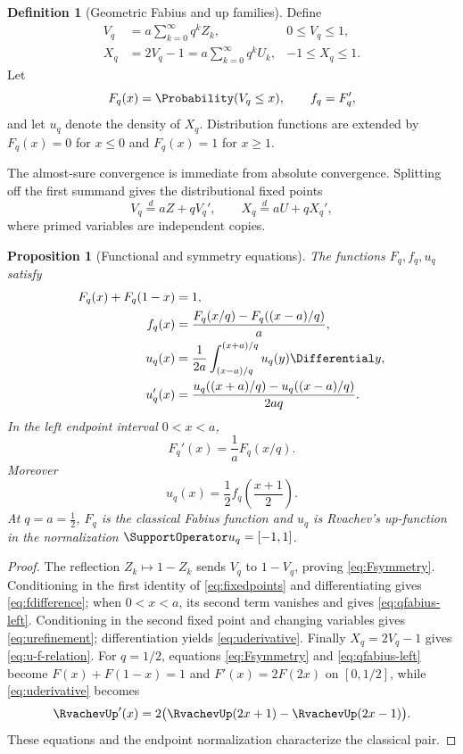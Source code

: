 \documentclass[11pt,oneside]{article}
\newtheorem{proposition}[theorem]{Proposition}
\theoremstyle{definition}
\newtheorem{definition}[theorem]{Definition}
\theoremstyle{remark}
\begin{document}
\begin{definition}[Geometric Fabius and up families]
Define
\begin{align}
 V_q&=a\sum_{k=0}^{\infty}q^kZ_k, & 0\le V_q\le1,\\
 X_q&=2V_q-1=a\sum_{k=0}^{\infty}q^kU_k, & -1\le X_q\le1.
\end{align}
Let
\[
 F_q(x)=\Probability(V_q\le x),\qquad f_q=F_q',
\]
and let $u_q$ denote the density of $X_q$.  Distribution functions are extended by
$F_q(x)=0$ for $x\le0$ and $F_q(x)=1$ for $x\ge1$.
\end{definition}

The almost-sure convergence is immediate from absolute convergence.  Splitting off the
first summand gives the distributional fixed points
\begin{equation}
 V_q\overset d=aZ+qV_q',\qquad X_q\overset d=aU+qX_q',
 \label{eq:fixedpoints}
\end{equation}
where primed variables are independent copies.

\begin{proposition}[Functional and symmetry equations]
The functions $F_q,f_q,u_q$ satisfy
\begin{align}
 F_q(x)+F_q(1-x)&=1,\label{eq:Fsymmetry}\\
 f_q(x)&=\frac{F_q(x/q)-F_q((x-a)/q)}{a},\label{eq:fdifference}\\
 u_q(x)&=\frac1{2a}\int_{(x-a)/q}^{(x+a)/q}u_q(y)\Differential y,\label{eq:urefinement}\\
 u_q'(x)&=\frac{u_q((x+a)/q)-u_q((x-a)/q)}{2aq}.
 \label{eq:uderivative}
\end{align}
In the left endpoint interval $0<x<a$,
\begin{equation}
 F_q'(x)=\frac1aF_q(x/q).
 \label{eq:qfabius-left}
\end{equation}
Moreover
\begin{equation}
 u_q(x)=\frac12 f_q\!\left(\frac{x+1}{2}\right).
 \label{eq:u-f-relation}
\end{equation}
At $q=a=\tfrac12$, $F_q$ is the classical Fabius function and $u_q$ is Rvachev's
up-function in the normalization $\SupportOperator u_q=[-1,1]$.
\end{proposition}

\begin{proof}
The reflection $Z_k\mapsto1-Z_k$ sends $V_q$ to $1-V_q$, proving
\eqref{eq:Fsymmetry}.  Conditioning in the first identity of \eqref{eq:fixedpoints}
and differentiating gives \eqref{eq:fdifference}; when $0<x<a$, its second term
vanishes and gives \eqref{eq:qfabius-left}.  Conditioning in the second fixed point
and changing variables gives \eqref{eq:urefinement}; differentiation yields
\eqref{eq:uderivative}.  Finally $X_q=2V_q-1$ gives \eqref{eq:u-f-relation}.  For
$q=1/2$, equations \eqref{eq:Fsymmetry} and \eqref{eq:qfabius-left} become
$F(x)+F(1-x)=1$ and $F'(x)=2F(2x)$ on $[0,1/2]$, while
\eqref{eq:uderivative} becomes
\[
 \RvachevUp'(x)=2\bigl(\RvachevUp(2x+1)-\RvachevUp(2x-1)\bigr).
\]
These equations and the endpoint normalization characterize the classical pair.
\end{proof}
\end{document}
